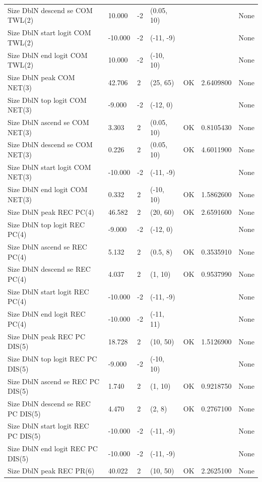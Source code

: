 \documentclass[11pt,
  english,
]{article}
\begin{document}
\begin{landscape}
\begin{longtable}[t]{lllllll}
Size DblN descend se COM TWL(2) & 10.000 & -2 & (0.05, 10) &  &  & None\\
Size DblN start logit COM TWL(2) & -10.000 & -2 & (-11, -9) &  &  & None\\
\addlinespace
Size DblN end logit COM TWL(2) & 10.000 & -2 & (-10, 10) &  &  & None\\
Size DblN peak COM NET(3) & 42.706 & 2 & (25, 65) & OK & 2.6409800 & None\\
Size DblN top logit COM NET(3) & -9.000 & -2 & (-12, 0) &  &  & None\\
Size DblN ascend se COM NET(3) & 3.303 & 2 & (0.05, 10) & OK & 0.8105430 & None\\
Size DblN descend se COM NET(3) & 0.226 & 2 & (0.05, 10) & OK & 4.6011900 & None\\
\addlinespace
Size DblN start logit COM NET(3) & -10.000 & -2 & (-11, -9) &  &  & None\\
Size DblN end logit COM NET(3) & 0.332 & 2 & (-10, 10) & OK & 1.5862600 & None\\
Size DblN peak REC PC(4) & 46.582 & 2 & (20, 60) & OK & 2.6591600 & None\\
Size DblN top logit REC PC(4) & -9.000 & -2 & (-12, 0) &  &  & None\\
Size DblN ascend se REC PC(4) & 5.132 & 2 & (0.5, 8) & OK & 0.3535910 & None\\
\addlinespace
Size DblN descend se REC PC(4) & 4.037 & 2 & (1, 10) & OK & 0.9537990 & None\\
Size DblN start logit REC PC(4) & -10.000 & -2 & (-11, -9) &  &  & None\\
Size DblN end logit REC PC(4) & -10.000 & -2 & (-11, 11) &  &  & None\\
Size DblN peak REC PC DIS(5) & 18.728 & 2 & (10, 50) & OK & 1.5126900 & None\\
Size DblN top logit REC PC DIS(5) & -9.000 & -2 & (-10, 10) &  &  & None\\
\addlinespace
Size DblN ascend se REC PC DIS(5) & 1.740 & 2 & (1, 10) & OK & 0.9218750 & None\\
Size DblN descend se REC PC DIS(5) & 4.470 & 2 & (2, 8) & OK & 0.2767100 & None\\
Size DblN start logit REC PC DIS(5) & -10.000 & -2 & (-11, -9) &  &  & None\\
Size DblN end logit REC PC DIS(5) & -10.000 & -2 & (-11, -9) &  &  & None\\
Size DblN peak REC PR(6) & 40.022 & 2 & (10, 50) & OK & 2.2625100 & None\\

\end{longtable}
\end{landscape}
\end{document}
